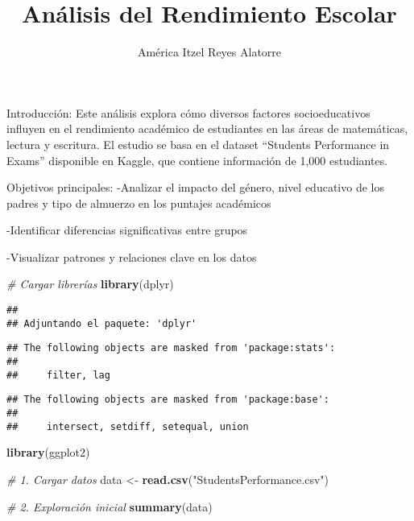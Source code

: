 \documentclass[
]{article}
\title{Análisis del Rendimiento Escolar}
\author{América Itzel Reyes Alatorre}
\date{}
\newenvironment{Shaded}{\begin{snugshade}}{\end{snugshade}}
\newcommand{\CommentTok}[1]{\textcolor[rgb]{0.56,0.35,0.01}{\textit{#1}}}
\newcommand{\FunctionTok}[1]{\textcolor[rgb]{0.13,0.29,0.53}{\textbf{#1}}}
\newcommand{\NormalTok}[1]{#1}
\newcommand{\OtherTok}[1]{\textcolor[rgb]{0.56,0.35,0.01}{#1}}
\newcommand{\StringTok}[1]{\textcolor[rgb]{0.31,0.60,0.02}{#1}}
\begin{document}
\maketitle

Introducción: Este análisis explora cómo diversos factores
socioeducativos influyen en el rendimiento académico de estudiantes en
las áreas de matemáticas, lectura y escritura. El estudio se basa en el
dataset ``Students Performance in Exams'' disponible en Kaggle, que
contiene información de 1,000 estudiantes.

Objetivos principales: -Analizar el impacto del género, nivel educativo
de los padres y tipo de almuerzo en los puntajes académicos

-Identificar diferencias significativas entre grupos

-Visualizar patrones y relaciones clave en los datos

\begin{Shaded}
\begin{Highlighting}[]
\CommentTok{\# Cargar librerías}
\FunctionTok{library}\NormalTok{(dplyr)}
\end{Highlighting}
\end{Shaded}

\begin{verbatim}
## 
## Adjuntando el paquete: 'dplyr'
\end{verbatim}

\begin{verbatim}
## The following objects are masked from 'package:stats':
## 
##     filter, lag
\end{verbatim}

\begin{verbatim}
## The following objects are masked from 'package:base':
## 
##     intersect, setdiff, setequal, union
\end{verbatim}

\begin{Shaded}
\begin{Highlighting}[]
\FunctionTok{library}\NormalTok{(ggplot2)}

\CommentTok{\# 1. Cargar datos}
\NormalTok{data }\OtherTok{\textless{}{-}} \FunctionTok{read.csv}\NormalTok{(}\StringTok{"StudentsPerformance.csv"}\NormalTok{)}

\CommentTok{\# 2. Exploración inicial}
\FunctionTok{summary}\NormalTok{(data) }
\end{Highlighting}
\end{Shaded}
\end{document}
